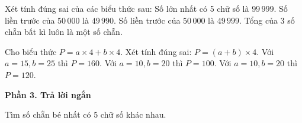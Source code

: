 \begin{ex} %
Xét tính đúng sai của các biểu thức sau:
\choiceTF
{\True Số lớn nhất có 5 chữ số là $99\,999$.}
{Số liền trước của $50\,000$ là $49\,990$.}
{\True Số liền trước của $50\,000$ là $49\,999$.}
{\True Tổng của 3 số chẵn bất kì luôn là một số chẵn.}
\end{ex}

\begin{ex} %
Cho biểu thức $P = a \times 4 + b \times 4$. Xét tính đúng sai:
\choiceTF
{\True $P = (a + b) \times 4$.}
{\True Với $a = 15, b = 25$ thì $P = 160$.}
{Với $a = 10, b = 20$ thì $P = 100$.}
{\True Với $a = 10, b = 20$ thì $P = 120$.}
\end{ex}

\textbf{Phần 3. Trả lời ngắn}

\begin{ex} %
Tìm số chẵn bé nhất có 5 chữ số khác nhau.
\end{ex}

